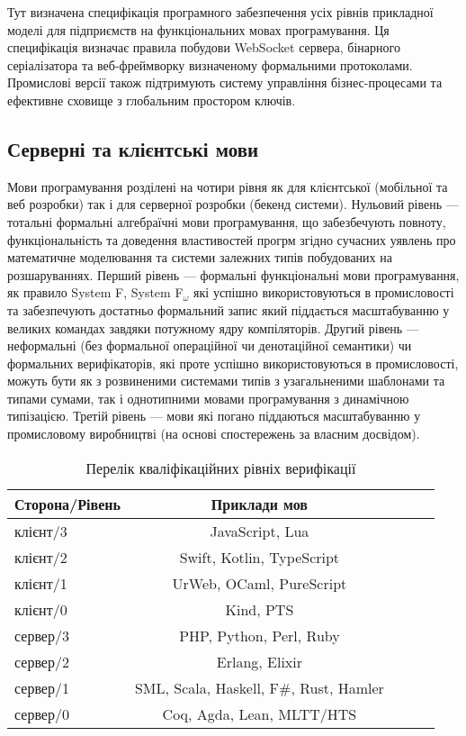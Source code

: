 Тут визначена специфікація програмного забезпечення усіх рівнів прикладної моделі
для підприємств на функціональних мовах програмування.
Ця специфікація визначає правила побудови WebSocket сервера,
бінарного серіалізатора та веб-фреймворку визначеному
формальними протоколами. Промислові версії також підтримують
систему управління бізнес-процесами та ефективне сховище
з глобальним простором ключів.

\subsection*{Серверні та клієнтські мови}
Мови програмування розділені на чотири рівня як для клієнтської
(мобільної та веб розробки) так і для серверної розробки (бекенд
системи). Нульовий рівень — тотальні формальні алгебраїчні мови
програмування, що забезбечують повноту, функціональність та доведення
властивостей прогрм згідно сучасних уявлень про математичне моделювання
та системи залежних типів побудованих на розшаруваннях. Перший
рівень — формальні функціональні мови програмування, як правило
System F, System F$_\omega$ які успішно використовуються в промисловості
та забезпечують достатньо формальний запис який піддається
масштабуванню у великих командах завдяки потужному ядру компіляторів.
Другий рівень — неформальні (без формальної операційної чи денотаційної
семантики) чи формальних верифікаторів, які проте успішно
використовуються в промисловості, можуть бути як з розвиненими
системами типів з узагальненими шаблонами та типами сумами,
так і однотипними мовами програмування з динамічною типізацією.
Третій рівень — мови які погано піддаються масштабуванню у
промисловому виробництві (на основі спостережень за власним досвідом).

\begin{table}[ht]
\begin{center}
\caption{Перелік кваліфікаційних рівніх верифікації}
\begin{tabular}{lcccc}
\hline
\rowcolor{ZimaBlue}
\textbf{Сторона/Рівень} & \textbf{Приклади мов} \\
\hline
    клієнт/3 & JavaScript, Lua \\
    клієнт/2 & Swift, Kotlin, TypeScript \\
\rowcolor{LightGray}
    клієнт/1 & UrWeb, OCaml, PureScript \\
\rowcolor{LightGray}
    клієнт/0 & Kind, PTS \\
    \hline
    сервер/3 & PHP, Python, Perl, Ruby \\
    сервер/2 & Erlang, Elixir \\
\rowcolor{LightGray}
    сервер/1 & SML, Scala, Haskell, F\#, Rust, Hamler \\
\rowcolor{LightGray}
    сервер/0 & Coq, Agda, Lean, MLTT/HTS \\
\hline
\end{tabular}
\end{center}
\end{table}

